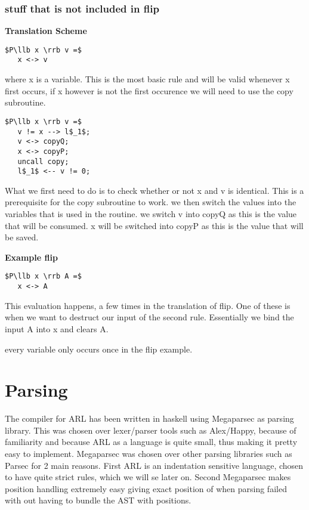 \documentclass[a4paper]{article}
\begin{document}
\subsubsection{stuff that is not included in flip}
\label{sec:org29ea71b}
\begin{minipage}[t]{0.6\textwidth}
\textbf{Translation Scheme}
\begin{lstlisting}
$P\llb x \rrb v =$
   x <-> v
\end{lstlisting}
where x is a variable. This is the most basic rule and will be valid whenever x first occurs, if x however is not the first occurence we will need to use the copy subroutine.
\begin{lstlisting}
$P\llb x \rrb v =$
   v != x --> l$_1$;
   v <-> copyQ;
   x <-> copyP;
   uncall copy;
   l$_1$ <-- v != 0;
\end{lstlisting}
What we first need to do is to check whether or not x and v is identical. This is a prerequisite for the copy subroutine to work. we then switch the values into the variables that is used in the routine. we switch v into copyQ as this is the value that will be consumed. x will be switched into copyP as this is the value that will be saved.
\end{minipage}
\qquad
\begin{minipage}[t]{0.4\textwidth}
\textbf{Example flip}
\begin{lstlisting}
$P\llb x \rrb A =$
   x <-> A
\end{lstlisting}
This evaluation happens, a few times in the translation of flip. One of these is when we want to destruct our input of the second rule. Essentially we bind the input A into x and clears A.

every variable only occurs once in the flip example.
\end{minipage}
\section{Parsing}
\label{sec:org3194683}
The compiler for ARL has been written in haskell using Megaparsec as parsing library. This was chosen over lexer/parser tools such as Alex/Happy, because of familiarity and because ARL as a language is quite small, thus making it pretty easy to implement. Megaparsec was chosen over other parsing libraries such as Parsec for 2 main reasons. First ARL is an indentation sensitive language, chosen to have quite strict rules, which we will se later on. Second Megaparsec makes position handling extremely easy giving exact position of when parsing failed with out having to bundle the AST with positions.
\end{document}
